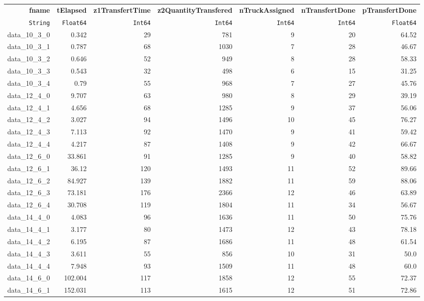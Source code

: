 \begin{tabular}{rrrrrrr}
  \hline
  \textbf{fname} & \textbf{tElapsed} & \textbf{z1TransfertTime} & \textbf{z2QuantityTransfered} & \textbf{nTruckAssigned} & \textbf{nTransfertDone} & \textbf{pTransfertDone} \\
  \texttt{String} & \texttt{Float64} & \texttt{Int64} & \texttt{Int64} & \texttt{Int64} & \texttt{Int64} & \texttt{Float64} \\\hline
  data\_10\_3\_0 & 0.342 & 29 & 781 & 9 & 20 & 64.52 \\
  data\_10\_3\_1 & 0.787 & 68 & 1030 & 7 & 28 & 46.67 \\
  data\_10\_3\_2 & 0.646 & 52 & 949 & 8 & 28 & 58.33 \\
  data\_10\_3\_3 & 0.543 & 32 & 498 & 6 & 15 & 31.25 \\
  data\_10\_3\_4 & 0.79 & 55 & 968 & 7 & 27 & 45.76 \\
  data\_12\_4\_0 & 9.707 & 63 & 980 & 8 & 29 & 39.19 \\
  data\_12\_4\_1 & 4.656 & 68 & 1285 & 9 & 37 & 56.06 \\
  data\_12\_4\_2 & 3.027 & 94 & 1496 & 10 & 45 & 76.27 \\
  data\_12\_4\_3 & 7.113 & 92 & 1470 & 9 & 41 & 59.42 \\
  data\_12\_4\_4 & 4.217 & 87 & 1408 & 9 & 42 & 66.67 \\
  data\_12\_6\_0 & 33.861 & 91 & 1285 & 9 & 40 & 58.82 \\
  data\_12\_6\_1 & 36.12 & 120 & 1493 & 11 & 52 & 89.66 \\
  data\_12\_6\_2 & 84.927 & 139 & 1882 & 11 & 59 & 88.06 \\
  data\_12\_6\_3 & 73.181 & 176 & 2366 & 12 & 46 & 63.89 \\
  data\_12\_6\_4 & 30.708 & 119 & 1804 & 11 & 34 & 56.67 \\
  data\_14\_4\_0 & 4.083 & 96 & 1636 & 11 & 50 & 75.76 \\
  data\_14\_4\_1 & 3.177 & 80 & 1473 & 12 & 43 & 78.18 \\
  data\_14\_4\_2 & 6.195 & 87 & 1686 & 11 & 48 & 61.54 \\
  data\_14\_4\_3 & 3.611 & 55 & 856 & 10 & 31 & 50.0 \\
  data\_14\_4\_4 & 7.948 & 93 & 1509 & 11 & 48 & 60.0 \\
  data\_14\_6\_0 & 102.004 & 117 & 1858 & 12 & 55 & 72.37 \\
  data\_14\_6\_1 & 152.031 & 113 & 1615 & 12 & 51 & 72.86 \\

\end{tabular}

